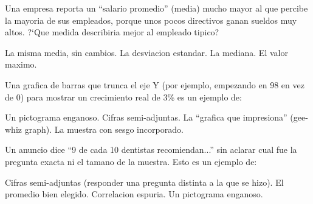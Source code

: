\documentclass[12pt,addpoints]{exam}
\begin{document}
\begin{questions}
\question[1] Una empresa reporta un ``salario promedio'' (media) mucho mayor
al que percibe la mayoria de sus empleados, porque unos pocos directivos
ganan sueldos muy altos. ?`Que medida describiria mejor al empleado tipico?
\begin{choices}
  \choice La misma media, sin cambios.
  \choice La desviacion estandar.
  \CorrectChoice La mediana.
  \choice El valor maximo.
\end{choices}

\question[1] Una grafica de barras que trunca el eje Y (por ejemplo,
empezando en 98 en vez de 0) para mostrar un crecimiento real de 3\% es un
ejemplo de:
\begin{choices}
  \choice Un pictograma enganoso.
  \choice Cifras semi-adjuntas.
  \CorrectChoice La ``grafica que impresiona'' (gee-whiz graph).
  \choice La muestra con sesgo incorporado.
\end{choices}

\question[1] Un anuncio dice ``9 de cada 10 dentistas recomiendan...'' sin
aclarar cual fue la pregunta exacta ni el tamano de la muestra. Esto es un
ejemplo de:
\begin{choices}
  \CorrectChoice Cifras semi-adjuntas (responder una pregunta distinta a la
    que se hizo).
  \choice El promedio bien elegido.
  \choice Correlacion espuria.
  \choice Un pictograma enganoso.
\end{choices}

\end{questions}
\end{document}
